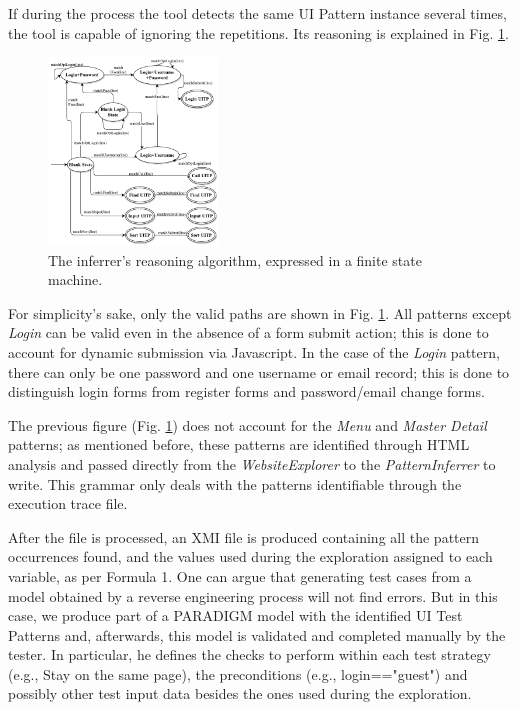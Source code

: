 \documentclass[10pt, conference, compsocconf]{IEEEtran}
\begin{document}
If during the process the tool detects the same UI Pattern instance several times, the tool is capable of ignoring the repetitions. Its reasoning is explained in Fig. \ref{fig:inferrer}.

\begin{figure}[!htb]
\centering
\includegraphics[width=0.4\textwidth]{Global_State_Machine.pdf}
\caption{The inferrer's reasoning algorithm, expressed in a finite state machine.}
\label{fig:inferrer}
\end{figure}

For simplicity's sake, only the valid paths are shown in Fig. \ref{fig:inferrer}. All patterns except \textit{Login} can be valid even in the absence of a form submit action; this is done to account for dynamic submission via Javascript. In the case of the \textit{Login} pattern, there can only be one password and one username or email record; this is done to distinguish login forms from register forms and password/email change forms.

The previous figure (Fig. \ref{fig:inferrer}) does not account for the \textit{Menu} and \textit{Master Detail} patterns; as mentioned before, these patterns are identified through HTML analysis and passed directly from the \textit{WebsiteExplorer} to the \textit{PatternInferrer} to write. This grammar only deals with the patterns identifiable through the execution trace file.

After the file is processed, an XMI file is produced containing all the pattern occurrences found, and the values used during the exploration assigned to each variable, as per Formula 1. %
One can argue that generating test cases from a model obtained by a reverse engineering process will not find errors. But in this case, we produce part of a PARADIGM model with the identified UI Test Patterns and, afterwards, this model is validated and completed manually by the tester. In particular, he defines the checks to perform within each test strategy (e.g., Stay on the same page), the preconditions (e.g., login=="guest") and possibly other test input data besides the ones used during the exploration.
\end{document}
